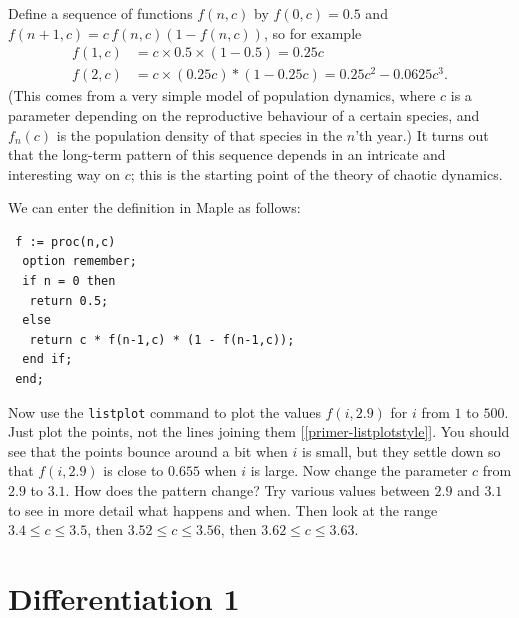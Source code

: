 \documentclass[a4paper,10pt]{amsbook}
\begin{document}
\begin{exercise}
 Define a sequence of functions $f(n,c)$ by $f(0,c)=0.5$ and
 $f(n+1,c)=c\,f(n,c)(1-f(n,c))$, so for example
 \begin{align*}
  f(1,c) &= c\times 0.5 \times (1-0.5) = 0.25 c \\
  f(2,c) &= c \times (0.25 c) * (1-0.25c) = 0.25c^2 - 0.0625 c^3. 
 \end{align*}
 (This comes from a very simple model of population dynamics, where
 $c$ is a parameter depending on the reproductive behaviour of a
 certain species, and $f_n(c)$ is the population density of that
 species in the $n$'th year.)  It turns out that the long-term
 pattern of this sequence depends in an intricate and interesting way
 on $c$; this is the starting point of the theory of chaotic
 dynamics. 

 We can enter the definition in Maple as follows:
\begin{verbatim}
 f := proc(n,c)
  option remember;
  if n = 0 then
   return 0.5;
  else 
   return c * f(n-1,c) * (1 - f(n-1,c));
  end if;
 end;
\end{verbatim}
 Now use the \verb~listplot~ command to plot the values $f(i,2.9)$
 for $i$ from $1$ to $500$.  Just plot the points, not the lines
 joining them [\ref{primer-listplotstyle}].  You should see that the
 points bounce around a bit when $i$ is small, but they settle down so
 that $f(i,2.9)$ is close to $0.655$ when $i$ is large.  Now change
 the parameter $c$ from $2.9$ to $3.1$.  How does the pattern change?
 Try various values between $2.9$ and $3.1$ to see in more detail what
 happens and when.  Then look at the range $3.4\leq c\leq 3.5$, then
 $3.52\leq c\leq 3.56$, then $3.62\leq c\leq 3.63$. 

\end{exercise}

\chapter{Differentiation 1}
\end{document}
